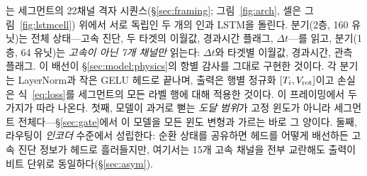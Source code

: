 \documentclass[10pt,a4paper]{article}
\begin{document}
\seqv{}는 세그먼트의 22채널 격자 시퀀스(\S\ref{sec:framing}; 그림~\ref{fig:arch}, 셀은 그림~\ref{fig:lstmcell}) 위에서 서로 독립인
두 개의 인과 LSTM을 돌린다. \Ti{} 분기(2층, 160 유닛)는 전체 상태---고속 진단,
두 타겟의 이월값, 경과시간 플래그, $\Delta t$---를 읽고, \Vrot{} 분기(1층,
64 유닛)는 \emph{고속이 아닌 7개 채널만} 읽는다: $\Delta t$와 타겟별 이월값,
경과시간, 관측 플래그. 이 배선이 \S\ref{sec:model:physics}의 항별 감사를 그대로
구현한 것이다. 각 분기는 LayerNorm과 작은 GELU 헤드로 끝나며, 출력은
행별 정규화 $[T_i, V_\mathrm{rot}]$이고 손실은 식~\eqref{eq:loss}를 세그먼트의 모든 라벨
행에 대해 적용한 것이다. 이 프레이밍에서 두 가지가 따라 나온다. 첫째, 모델이
과거로 뻗는 \emph{도달 범위}가 고정 윈도가 아니라 세그먼트 전체다---\S\ref{sec:gate}에서 이
모델을 모든 윈도 변형과 가르는 바로 그 양이다. 둘째, 라우팅이 \emph{인코더}
수준에서 성립한다: 순환 상태를 공유하면 헤드를 어떻게 배선하든 고속 진단 정보가
\Vrot{} 헤드로 흘러들지만, 여기서는 15개 고속 채널을 전부 교란해도 \Vrot{}
출력이 비트 단위로 동일하다(\S\ref{sec:asym}).
\end{document}
